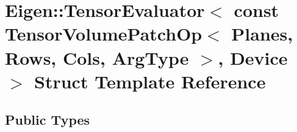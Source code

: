 \hypertarget{struct_eigen_1_1_tensor_evaluator_3_01const_01_tensor_volume_patch_op_3_01_planes_00_01_rows_00_7868d50e868058a145e213ecbb5a830e}{}\section{Eigen\+:\+:Tensor\+Evaluator$<$ const Tensor\+Volume\+Patch\+Op$<$ Planes, Rows, Cols, Arg\+Type $>$, Device $>$ Struct Template Reference}
\label{struct_eigen_1_1_tensor_evaluator_3_01const_01_tensor_volume_patch_op_3_01_planes_00_01_rows_00_7868d50e868058a145e213ecbb5a830e}
\subsection*{Public Types}
